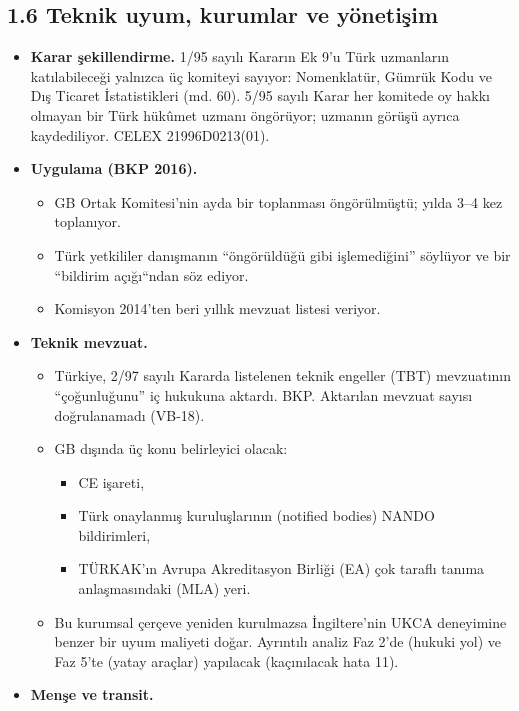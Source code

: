 \hypertarget{01_teshis-16-teknik-uyum-kurumlar-ve-yuxf6netiux15fim}{%
\subsection{1.6 Teknik uyum, kurumlar ve yönetişim}\label{01_teshis-16-teknik-uyum-kurumlar-ve-yuxf6netiux15fim}}

\begin{itemize}
\tightlist
\item
  \textbf{Karar şekillendirme.} 1/95 sayılı Kararın Ek 9'u Türk uzmanların katılabileceği yalnızca üç komiteyi sayıyor: Nomenklatür, Gümrük Kodu ve Dış Ticaret İstatistikleri (md. 60). 5/95 sayılı Karar her komitede oy hakkı olmayan bir Türk hükûmet uzmanı öngörüyor; uzmanın görüşü ayrıca kaydediliyor. \etiketV{} CELEX 21996D0213(01).
\item
  \textbf{Uygulama (BKP 2016).} \etiketV{}

  \begin{itemize}
  \tightlist
  \item
    GB Ortak Komitesi'nin ayda bir toplanması öngörülmüştü; yılda 3--4 kez toplanıyor.
  \item
    Türk yetkililer danışmanın ``öngörüldüğü gibi işlemediğini'' söylüyor ve bir ``bildirim açığı``ndan söz ediyor.
  \item
    Komisyon 2014'ten beri yıllık mevzuat listesi veriyor.
  \end{itemize}
\item
  \textbf{Teknik mevzuat.}

  \begin{itemize}
  \tightlist
  \item
    Türkiye, 2/97 sayılı Kararda listelenen teknik engeller (TBT) mevzuatının ``çoğunluğunu'' iç hukukuna aktardı. \etiketV{} BKP. Aktarılan mevzuat sayısı doğrulanamadı (VB-18).
  \item
    GB dışında üç konu belirleyici olacak:

    \begin{itemize}
    \tightlist
    \item
      CE işareti,
    \item
      Türk onaylanmış kuruluşlarının (notified bodies) NANDO bildirimleri,
    \item
      TÜRKAK'ın Avrupa Akreditasyon Birliği (EA) çok taraflı tanıma anlaşmasındaki (MLA) yeri.
    \end{itemize}
  \item
    Bu kurumsal çerçeve yeniden kurulmazsa İngiltere'nin UKCA deneyimine benzer bir uyum maliyeti doğar. Ayrıntılı analiz Faz 2'de (hukuki yol) ve Faz 5'te (yatay araçlar) yapılacak (kaçınılacak hata 11). \etiketD{}
  \end{itemize}
\item
  \textbf{Menşe ve transit.}


\end{itemize}

